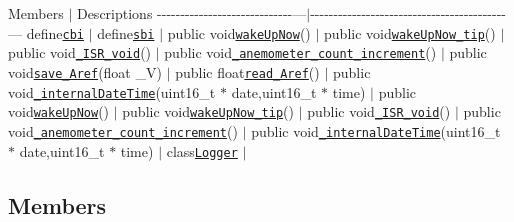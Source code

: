 Members $\vert$ Descriptions -\/-\/-\/-\/-\/-\/-\/-\/-\/-\/-\/-\/-\/-\/-\/-\/-\/-\/-\/-\/-\/-\/-\/-\/-\/-\/-\/-\/-\/---$\vert$-\/-\/-\/-\/-\/-\/-\/-\/-\/-\/-\/-\/-\/-\/-\/-\/-\/-\/-\/-\/-\/-\/-\/-\/-\/-\/-\/-\/-\/-\/-\/-\/-\/-\/-\/-\/-\/-\/-\/-\/-\/-\/--- {\ttfamily define}\href{#Logger_8cpp_1ae70baf5399951da1e7ad45a0ed890832}{\tt {\ttfamily cbi}} $\vert$ {\ttfamily define}\href{#Logger_8cpp_1ac4a5536d9bf092116f88b94797ddc882}{\tt {\ttfamily sbi}} $\vert$ {\ttfamily public void}\href{#Logger_8cpp_1adee29828901ea1b4f99ce305fa3e17bd}{\tt {\ttfamily wake\+Up\+Now}}{\ttfamily ()} $\vert$ {\ttfamily public void}\href{#Logger_8cpp_1a1a3b380e75d68eef4c3913816773e1b5}{\tt {\ttfamily wake\+Up\+Now\+\_\+tip}}{\ttfamily ()} $\vert$ {\ttfamily public void}\href{#Logger_8cpp_1a9c215a00c214c880d04481d256d8d522}{\tt {\ttfamily \+\_\+\+I\+S\+R\+\_\+void}}{\ttfamily ()} $\vert$ {\ttfamily public void}\href{#Logger_8cpp_1aa2e4ccb5b638347db4da535aac7ac209}{\tt {\ttfamily \+\_\+anemometer\+\_\+count\+\_\+increment}}{\ttfamily ()} $\vert$ {\ttfamily public void}\href{#Logger_8cpp_1a144189fccfe80979cc2fcafefdf2728a}{\tt {\ttfamily save\+\_\+\+Aref}}{\ttfamily (float \+\_\+V)} $\vert$ {\ttfamily public float}\href{#Logger_8cpp_1ae9bf4d0d2809a902be80dbf825844636}{\tt {\ttfamily read\+\_\+\+Aref}}{\ttfamily ()} $\vert$ {\ttfamily public void}\href{#Logger_8cpp_1a7551515cf6f018df3d8d942710936aef}{\tt {\ttfamily \+\_\+internal\+Date\+Time}}{\ttfamily (uint16\+\_\+t $\ast$ date,uint16\+\_\+t $\ast$ time)} $\vert$ {\ttfamily public void}\href{#Logger_8h_1adee29828901ea1b4f99ce305fa3e17bd}{\tt {\ttfamily wake\+Up\+Now}}{\ttfamily ()} $\vert$ {\ttfamily public void}\href{#Logger_8h_1a1a3b380e75d68eef4c3913816773e1b5}{\tt {\ttfamily wake\+Up\+Now\+\_\+tip}}{\ttfamily ()} $\vert$ {\ttfamily public void}\href{#Logger_8h_1a9c215a00c214c880d04481d256d8d522}{\tt {\ttfamily \+\_\+\+I\+S\+R\+\_\+void}}{\ttfamily ()} $\vert$ {\ttfamily public void}\href{#Logger_8h_1aa2e4ccb5b638347db4da535aac7ac209}{\tt {\ttfamily \+\_\+anemometer\+\_\+count\+\_\+increment}}{\ttfamily ()} $\vert$ {\ttfamily public void}\href{#Logger_8h_1a7551515cf6f018df3d8d942710936aef}{\tt {\ttfamily \+\_\+internal\+Date\+Time}}{\ttfamily (uint16\+\_\+t $\ast$ date,uint16\+\_\+t $\ast$ time)} $\vert$ {\ttfamily class}\href{#classLogger}{\tt {\ttfamily Logger}} $\vert$

\subsection*{Members}

